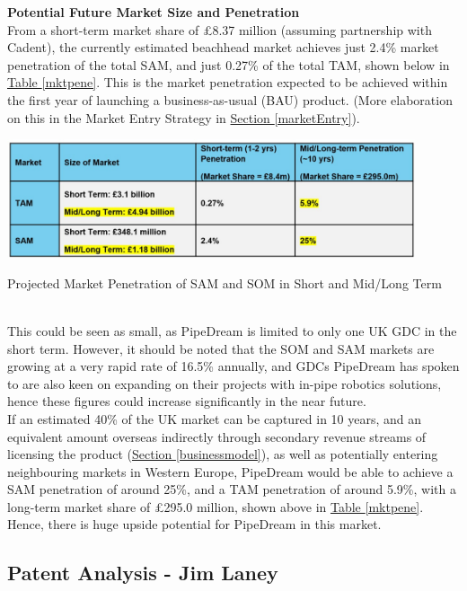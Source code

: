 \documentclass[11pt]{article}		%
\newcommand{\tableref}[1]{\hyperref[#1]{Table \ref*{#1}}}     %
\newcommand{\sectref}[1]{\hyperref[#1]{Section \ref*{#1}}}     %
\begin{document}
    \textbf{Potential Future Market Size and Penetration}
    \\
    From a short-term market share of £8.37 million (assuming partnership with Cadent), the currently estimated beachhead market achieves just 2.4\% market penetration of the total SAM, and just 0.27\% of the total TAM, shown below in \tableref{mktpene}. This is the market penetration expected to be achieved within the first year of launching a business-as-usual (BAU) product. (More elaboration on this in the Market Entry Strategy in \sectref{marketEntry}). 
        \begin{table}[h]
			\centering
			\includegraphics[width=0.9\textwidth]{mktpenetration.jpg}
			\caption{Projected Market Penetration of SAM and SOM in Short and Mid/Long Term}
			\label{mktpene}
 		\end{table}
    \\
    \hspace*{2ex}This could be seen as small, as PipeDream is limited to only one UK GDC in the short term. However, it should be noted that the SOM and SAM markets are growing at a very rapid rate of 16.5\% annually, and GDCs PipeDream has spoken to are also keen on expanding on their projects with in-pipe robotics solutions, hence these figures could increase significantly in the near future.
    \\
    \hspace*{2ex}If an estimated 40\% of the UK market can be captured in 10 years, and an equivalent amount overseas indirectly through secondary revenue streams of licensing the product (\sectref{businessmodel}), as well as potentially entering neighbouring markets in Western Europe, PipeDream would be able to achieve a SAM penetration of around 25\%, and a TAM penetration of around 5.9\%, with a long-term market share of £295.0 million, shown above in \tableref{mktpene}. Hence, there is huge upside potential for PipeDream in this market. 

	\subsection[Patent Analysis]{Patent Analysis - Jim Laney} \label{patentAnalysis}
        
\end{document}
